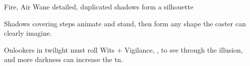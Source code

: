   {Fire, Air}%
  {Wane}%
  {detailed, duplicated}%
  {}%
  { shadows form a silhouette}%
  {
    Shadows covering  steps animate and stand, then form any shape the caster can clearly imagine.

    \setcounter{track}{\value{spelllevel}}
    \addtocounter{track}{7}
    Onlookers in twilight must roll Wits + Vigilance, , to see through the illusion, and more darkness can increase the \gls{tn}.
  }

